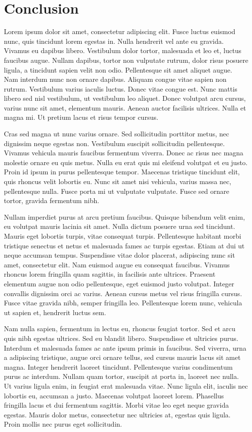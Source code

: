 \chapter*{Conclusion}

Lorem ipsum dolor sit amet, consectetur adipiscing elit. Fusce luctus
euismod nunc, quis tincidunt lorem egestas in. Nulla hendrerit vel
ante eu gravida. Vivamus eu dapibus libero. Vestibulum dolor tortor,
malesuada et leo et, luctus faucibus augue. Nullam dapibus, tortor non
vulputate rutrum, dolor risus posuere ligula, a tincidunt sapien velit
non odio. Pellentesque sit amet aliquet augue. Nam interdum nunc non
ornare dapibus. Aliquam congue vitae sapien non rutrum. Vestibulum
varius iaculis luctus. Donec vitae congue est. Nunc mattis libero sed
nisl vestibulum, ut vestibulum leo aliquet. Donec volutpat arcu
cursus, varius nunc sit amet, elementum mauris. Aenean auctor
facilisis ultrices. Nulla et magna mi. Ut pretium lacus et risus
tempor cursus.

 Cras sed magna ut nunc varius ornare. Sed sollicitudin porttitor
 metus, nec dignissim neque egestas non. Vestibulum suscipit
 sollicitudin pellentesque. Vivamus vehicula mauris faucibus fermentum
 viverra. Donec ac risus nec magna molestie ornare eu quis metus.
 Nulla eu erat quis mi eleifend volutpat et eu justo. Proin id ipsum
 in purus pellentesque tempor. Maecenas tristique tincidunt elit, quis
 rhoncus velit lobortis eu. Nunc sit amet nisi vehicula, varius massa
 nec, pellentesque nulla. Fusce porta mi ut vulputate vulputate. Fusce
 sed ornare tortor, gravida fermentum nibh.

Nullam imperdiet purus at arcu pretium faucibus. Quisque bibendum
velit enim, eu volutpat mauris lacinia sit amet. Nulla dictum posuere
urna sed tincidunt. Mauris eget lobortis turpis, vitae consequat
turpis. Pellentesque habitant morbi tristique senectus et netus et
malesuada fames ac turpis egestas. Etiam at dui ut neque accumsan
tempus. Suspendisse vitae dolor placerat, adipiscing nunc sit amet,
consectetur elit. Nam euismod augue eu consequat faucibus. Vivamus
rhoncus lorem fringilla quam sagittis, in facilisis ante ultrices.
Praesent elementum augue non odio pellentesque, eget euismod justo
volutpat. Integer convallis dignissim orci ac varius. Aenean cursus
metus vel risus fringilla cursus. Fusce vitae gravida nibh, semper
fringilla leo. Pellentesque lorem nunc, vehicula ut sapien et,
hendrerit luctus sem.

Nam nulla sapien, fermentum in lectus eu, rhoncus feugiat tortor. Sed
et arcu quis nibh egestas ultrices. Sed eu blandit libero. Suspendisse
et ultricies purus. Interdum et malesuada fames ac ante ipsum primis
in faucibus. Sed viverra, urna a adipiscing tristique, augue orci
ornare tellus, sed cursus mauris lacus sit amet magna. Integer
hendrerit laoreet tincidunt. Pellentesque varius condimentum purus ac
interdum. Nullam quam tortor, suscipit at porta in, laoreet nec nulla.
Ut varius ligula enim, in feugiat erat malesuada vitae. Nunc ligula
elit, iaculis nec lobortis eu, accumsan a justo. Maecenas volutpat
laoreet lorem. Phasellus fringilla lacus et dui fermentum sagittis.
Morbi vitae leo eget neque gravida egestas. Mauris dolor metus,
consectetur nec ultricies at, egestas quis ligula. Proin mollis nec
purus eget sollicitudin.

